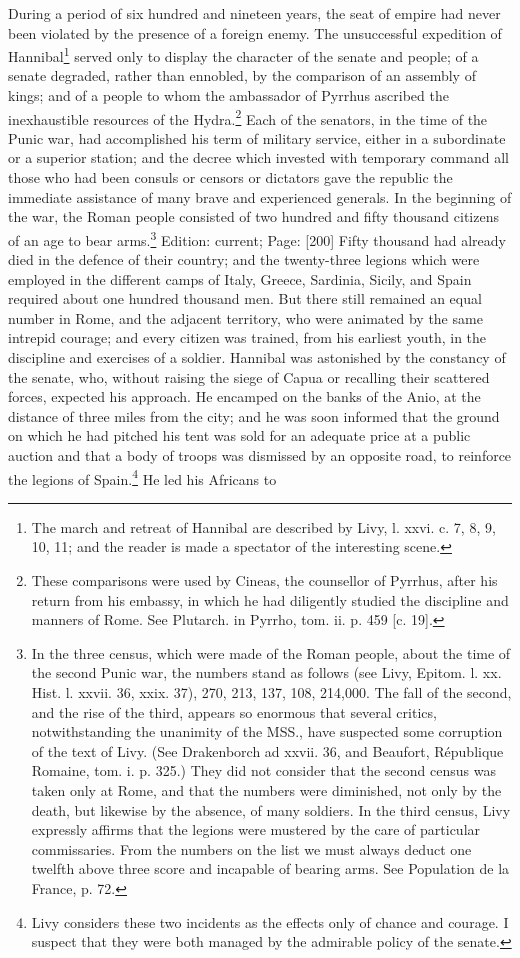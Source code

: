 During a period of six hundred and nineteen years, the seat of empire had never been violated by the presence of a foreign enemy. The unsuccessful expedition of Hannibal\footnote{The march and retreat of Hannibal are described by Livy, l. xxvi. c. 7, 8, 9, 10, 11; and the reader is made a spectator of the interesting scene.} served only to display the character of the senate and people; of a senate degraded, rather than ennobled, by the comparison of an assembly of kings; and of a people to whom the ambassador of Pyrrhus ascribed the inexhaustible resources of the Hydra.\footnote{These comparisons were used by Cineas, the counsellor of Pyrrhus, after his return from his embassy, in which he had diligently studied the discipline and manners of Rome. See Plutarch. in Pyrrho, tom. ii. p. 459 [c. 19].} Each of the senators, in the time of the Punic war, had accomplished his term of military service, either in a subordinate or a superior station; and the decree which invested with temporary command all those who had been consuls or censors or dictators gave the republic the immediate assistance of many brave and experienced generals. In the beginning of the war, the Roman people consisted of two hundred and fifty thousand citizens of an age to bear arms.\footnote{In the three census, which were made of the Roman people, about the time of the second Punic war, the numbers stand as follows (see Livy, Epitom. l. xx. Hist. l. xxvii. 36, xxix. 37), 270, 213, 137, 108, 214,000. The fall of the second, and the rise of the third, appears so enormous that several critics, notwithstanding the unanimity of the MSS., have suspected some corruption of the text of Livy. (See Drakenborch ad xxvii. 36, and Beaufort, République Romaine, tom. i. p. 325.) They did not consider that the second census was taken only at Rome, and that the numbers were diminished, not only by the death, but likewise by the absence, of many soldiers. In the third census, Livy expressly affirms that the legions were mustered by the care of particular commissaries. From the numbers on the list we must always deduct one twelfth above three score and incapable of bearing arms. See Population de la France, p. 72.} Edition: current; Page: [200] Fifty thousand had already died in the defence of their country; and the twenty-three legions which were employed in the different camps of Italy, Greece, Sardinia, Sicily, and Spain required about one hundred thousand men. But there still remained an equal number in Rome, and the adjacent territory, who were animated by the same intrepid courage; and every citizen was trained, from his earliest youth, in the discipline and exercises of a soldier. Hannibal was astonished by the constancy of the senate, who, without raising the siege of Capua or recalling their scattered forces, expected his approach. He encamped on the banks of the Anio, at the distance of three miles from the city; and he was soon informed that the ground on which he had pitched his tent was sold for an adequate price at a public auction and that a body of troops was dismissed by an opposite road, to reinforce the legions of Spain.\footnote{Livy considers these two incidents as the effects only of chance and courage. I suspect that they were both managed by the admirable policy of the senate.} He led his Africans to 